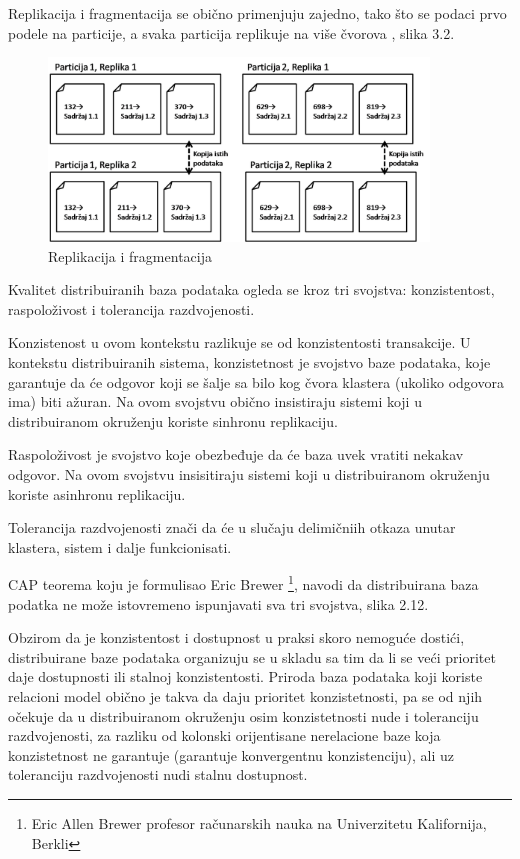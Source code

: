 \documentclass[12pt,oneside]{memoir}
\begin{document}
\pagebreak
Replikacija i fragmentacija se obično primenjuju zajedno, tako što se podaci prvo podele na particije, a svaka particija replikuje na više čvorova \cite{ColumnarOriented}, slika 3.2. 

\begin{figure}[!ht]
  \centering
  \includegraphics[width=0.9\textwidth]{replica-partition.png}
  \caption{Replikacija i fragmentacija}
  \label{fig:grafikon}
\end{figure}

Kvalitet distribuiranih baza podataka ogleda se kroz tri svojstva: konzistentost, raspoloživost i tolerancija razdvojenosti.

Konzistenost u ovom kontekstu razlikuje se od konzistentosti transakcije. U kontekstu distribuiranih sistema, konzistetnost je svojstvo baze podataka, koje garantuje da će odgovor koji se šalje sa bilo kog čvora klastera (ukoliko odgovora ima) biti ažuran. Na ovom svojstvu obično insistiraju sistemi koji u distribuiranom okruženju koriste sinhronu replikaciju.

Raspoloživost je svojstvo koje obezbeđuje da će baza uvek vratiti nekakav odgovor. Na ovom svojstvu insisitiraju sistemi koji u distribuiranom okruženju koriste asinhronu replikaciju.

Tolerancija razdvojenosti znači da će u slučaju delimičniih otkaza unutar klastera, sistem i dalje funkcionisati.

CAP teorema koju je formulisao Eric Brewer \footnote{Eric Allen Brewer profesor računarskih nauka na Univerzitetu Kalifornija, Berkli}, navodi da distribuirana baza podatka ne može istovremeno ispunjavati sva tri svojstva, slika 2.12.

Obzirom da je konzistentost i dostupnost u praksi skoro nemoguće dostići, distribuirane baze podataka organizuju se u skladu sa tim da li se veći prioritet daje dostupnosti ili stalnoj konzistentosti. Priroda baza podataka koji koriste relacioni model obično je takva da daju prioritet konzistetnosti, pa se od njih očekuje da u distribuiranom okruženju osim konzistetnosti nude i toleranciju razdvojenosti, za razliku od kolonski orijentisane nerelacione baze koja konzistetnost ne garantuje (garantuje konvergentnu konzistenciju), ali uz toleranciju razdvojenosti nudi stalnu dostupnost.
\end{document}
